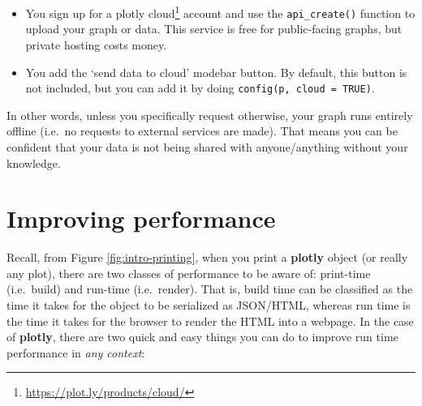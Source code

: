 \documentclass[
  12pt,
]{krantz}
\providecommand{\tightlist}{%
  \setlength{\itemsep}{0pt}\setlength{\parskip}{0pt}}
\renewcommand{\href}[2]{#2\footnote{\url{#1}}}
\begin{document}
\begin{itemize}
\tightlist
\item
  You sign up for a \href{https://plot.ly/products/cloud/}{plotly cloud} account and use the \texttt{api\_create()} function to upload your graph or data. This service is free for public-facing graphs, but private hosting costs money.
\item
  You add the `send data to cloud' modebar button. By default, this button is not included, but you can add it by doing \texttt{config(p,\ cloud\ =\ TRUE)}.
\end{itemize}

In other words, unless you specifically request otherwise, your graph runs entirely offline (i.e.~no requests to external services are made). That means you can be confident that your data is not being shared with anyone/anything without your knowledge.

\hypertarget{performance}{%
\chapter{Improving performance}\label{performance}}

Recall, from Figure \ref{fig:intro-printing}, when you print a \textbf{plotly} object (or really any plot), there are two classes of performance to be aware of: print-time (i.e.~build) and run-time (i.e.~render). That is, build time can be classified as the time it takes for the object to be serialized as JSON/HTML, whereas run time is the time it takes for the browser to render the HTML into a webpage. In the case of \textbf{plotly}, there are two quick and easy things you can do to improve run time performance in \emph{any context}:
\end{document}
